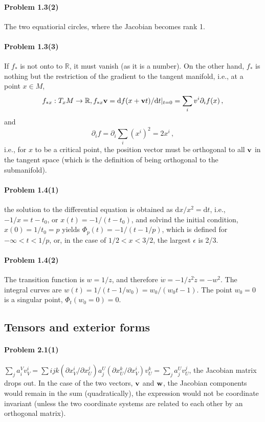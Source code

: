 \documentclass[a4paper,12pt]{article}
\def\d{\mathrm{d}}
\newcommand{\problem}[1]{\paragraph{Problem #1}}
\begin{document}
\problem{1.3(2)} The two equatiorial circles, where the Jacobian becomes rank 1.


\problem{1.3(3)} If $f_*$ is not onto to $\mathbb{R}$, it must vanish (as it is a number). On the other hand, $f_*$ is nothing but the restriction of the gradient to the tangent manifold, i.e., at a point $x\in M$,
\[
f_{*x} : T_x M \to \mathbb{R}, f_{*x} {\bf v} = \d f(x + {\bf v}t) / \d t|_{t=0} = \sum_i v^i \partial_i f(x)\,,
\]
and
\[
\partial_i f = \partial_i \sum_i (x^i)^2 = 2 x^i\,,
\]
i.e., for $x$ to be a critical point, the position vector must be orthogonal to all ${\bf v}$ in the tangent space (which is the definition of being orthogonal to the submanifold).


\problem{1.4(1)} the solution to the differential equation is obtained as $\d x / x^2 = \d t$, i.e., $-1/x = t - t_0$, or $x(t) = -1/(t-t_0)$, and solvind the initial condition, $x(0) = 1/t_0 = p$ yields $\Phi_p(t) = -1/(t-1/p)$, which is defined for $-\infty < t < 1/p$,
or, in the case of $1/2 < x < 3/2$, the largest $\epsilon$ is 2/3.


\problem{1.4(2)} The transition function is $w = 1/z$, and therefore $\dot w = -1/z^2 \dot z = -w^2$. The integral curves are $w(t) = 1/(t - 1/w_0) = w_0/(w_0 t -1)$. The point $w_0 = 0$ is a singular point, $\Phi_t(w_0 = 0) = 0$.


\subsection{Tensors and exterior forms}


\problem{2.1(1)} $\sum_j a_i^V v^i_V = \sum{ijk}(\partial x_V^i/\partial x_U^j) a_j^U (\partial x_U^k/\partial x_V^i) v_U^k = \sum_j a_j^U v^j_U$, the Jacobian matrix drops out. In the case of the two vectors, ${\bf v}$ and ${\bf w}$, the Jacobian components would remain in the sum (quadratically), the expression would not be coordinate invariant (unless the two coordinate systems are related to each other by an orthogonal matrix).
\end{document}
